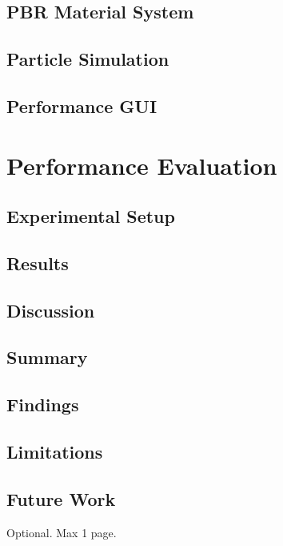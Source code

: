 \documentclass[12pt,a4paper,openright,twoside]{book}
\begin{document}
\section{PBR Material System}

\section{Particle Simulation}

\section{Performance GUI}

\chapter{Performance Evaluation}
\label{chap:evaluation}

\section{Experimental Setup}

\section{Results}

\section{Discussion}

\label{chap:conclusions}

\section{Summary}

\section{Findings}

\section{Limitations}

\section{Future Work}

\backmatter

\nocite{*} %




\begin{acknowledgements}
Optional. Max 1 page.
\end{acknowledgements}
\end{document}
